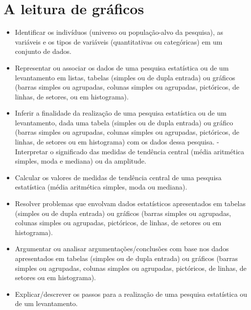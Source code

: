 
\chapter{A leitura de gráficos}

\begin{itemize}
\item Identificar os indivíduos (universo ou
população-alvo da pesquisa), as variáveis e os tipos de variáveis
(quantitativas ou categóricas) em um conjunto de dados.
\item
  Representar ou associar os dados de uma pesquisa estatística ou de um
  levantamento em listas, tabelas (simples ou de dupla entrada) ou
  gráficos (barras simples ou agrupadas, colunas simples ou agrupadas,
  pictóricos, de linhas, de setores, ou em histograma).
\item
  Inferir a finalidade da realização de uma pesquisa estatística ou de
  um levantamento, dada uma tabela (simples ou de dupla entrada) ou
  gráfico (barras simples ou agrupadas, colunas simples ou agrupadas,
  pictóricos, de linhas, de setores ou em histograma) com os dados dessa
  pesquisa. - Interpretar o significado das medidas de tendência central
  (média aritmética simples, moda e mediana) ou da amplitude.
\item
  Calcular os valores de medidas de tendência central de uma pesquisa
  estatística (média aritmética simples, moda ou mediana).
\item
  Resolver problemas que envolvam dados estatísticos apresentados em
  tabelas (simples ou de dupla entrada) ou gráficos (barras simples ou
  agrupadas, colunas simples ou agrupadas, pictóricos, de linhas, de
  setores ou em histograma).
\item
  Argumentar ou analisar argumentações/conclusões com base nos dados
  apresentados em tabelas (simples ou de dupla entrada) ou gráficos
  (barras simples ou agrupadas, colunas simples ou agrupadas,
  pictóricos, de linhas, de setores ou em histograma).
\item
  Explicar/descrever os passos para a realização de uma pesquisa
  estatística ou de um levantamento.
\end{itemize}

